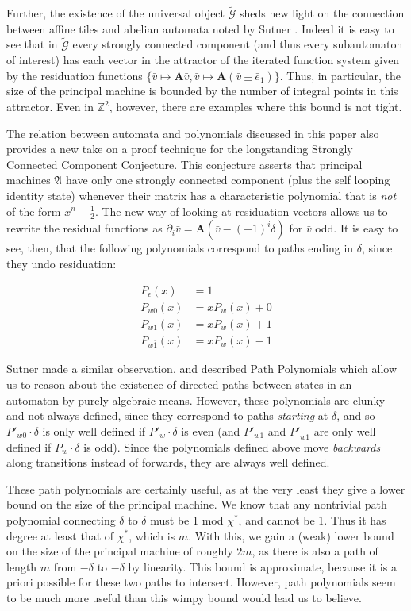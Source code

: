 \documentclass{article}
\newcommand{\G}{\mathcal{G}}
\renewcommand{\P}{\mathfrak{A}}
\newcommand{\Z}{\mathbb{Z}}
\newcommand{\2}{\textbf{2}}
\newcommand{\Am}{\textbf{A}}
\newcommand{\del}{\partial}
\newcommand{\vv}{\bar{v}}
\newcommand{\e}{\bar{e}}
\theoremstyle{definition}
\begin{document}
Further, the existence of the universal object $\widetilde{\G}$ 
sheds new light on the connection between affine tiles
\cite{LagariasWang96:tiles,LagariasWang97:integral_tiles}
and abelian automata noted by Sutner
\cite{Sutner18:abelian_automata}. 
Indeed it is easy to see that in 
$\widetilde{\G}$ every strongly connected component 
(and thus every subautomaton of interest) has each vector in the attractor 
of the iterated function system given by the residuation functions 
$\{ \vv \mapsto \Am \vv, \vv \mapsto \Am (\vv \pm \e_1) \}$.
Thus, in particular, the size of the principal machine is bounded by the
number of integral points in this attractor. Even in $\Z^2$, however, there
are examples where this bound is not tight.

The relation between automata and polynomials discussed in this paper 
also provides a new take on a proof technique for the longstanding
Strongly Connected Component Conjecture. This conjecture 
asserts that principal machines $\P$ have only one strongly connected component 
(plus the self looping identity state) whenever their matrix has a 
characteristic polynomial that is \emph{not} of the form $x^n + \frac{1}{2}$.
The new way of looking at residuation vectors allows us to rewrite the 
residual functions as $\del_i \vv = \Am (\vv - (-1)^i \delta)$ for $\vv$ odd.
It is easy to see, then, that the following polynomials correspond to paths
ending in $\delta$, since they undo residuation:

\begin{align*}
  P_\epsilon(x)   &= 1\\
  P_{w0}(x)       &= xP_w(x) + 0\\
  P_{w1}(x)       &= xP_w(x) + 1\\
  P_{w\bar{1}}(x) &= xP_w(x) - 1
\end{align*}

Sutner made a similar observation, and described Path Polynomials 
\cite{Sutner18:abelian_automata} which
allow us to reason about the existence of directed paths between states 
in an automaton by purely algebraic means. However, these polynomials are
clunky and not always defined, since they correspond to paths
\emph{starting} at $\delta$, and so $P'_{w0} \cdot \delta$ is only well 
defined if $P'_w \cdot \delta$ is even (and $P'_{w1}$ and $P'_{w\bar{1}}$ 
are only well defined if $P_w \cdot \delta$ is odd). Since the polynomials 
defined above move \emph{backwards} along transitions instead of forwards, 
they are always well defined.

These path polynomials are certainly useful, as at the very least they give
a lower bound on the size of the principal machine. We know that any nontrivial
path polynomial connecting $\delta$ to $\delta$ must be 1 mod $\chi^*$,
and cannot be 1. Thus it has degree at least that of $\chi^*$, which is $m$.
With this, we gain a (weak) lower bound on the size of the principal machine
of roughly $2m$, as there is also a path of length $m$ from $-\delta$ to 
$-\delta$ by linearity. This bound is approximate, because it is a priori 
possible for these two paths to intersect. However, path polynomials seem to
be much more useful than this wimpy bound would lead us to believe.
\end{document}

